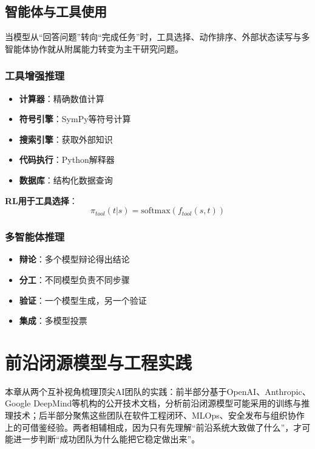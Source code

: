 \documentclass[12pt,a4paper]{article}
\begin{document}
\subsection{智能体与工具使用}

当模型从“回答问题”转向“完成任务”时，工具选择、动作排序、外部状态读写与多智能体协作就从附属能力转变为主干研究问题。

\subsubsection{工具增强推理}

\begin{itemize}
    \item \textbf{计算器}：精确数值计算
    \item \textbf{符号引擎}：SymPy等符号计算
    \item \textbf{搜索引擎}：获取外部知识
    \item \textbf{代码执行}：Python解释器
    \item \textbf{数据库}：结构化数据查询
\end{itemize}

\textbf{RL用于工具选择}：
\begin{equation}
\pi_{tool}(t | s) = \text{softmax}(f_{tool}(s, t))
\end{equation}

\subsubsection{多智能体推理}

\begin{itemize}
    \item \textbf{辩论}：多个模型辩论得出结论
    \item \textbf{分工}：不同模型负责不同步骤
    \item \textbf{验证}：一个模型生成，另一个验证
    \item \textbf{集成}：多模型投票
\end{itemize}

\section{前沿闭源模型与工程实践}

本章从两个互补视角梳理顶尖AI团队的实践：前半部分基于OpenAI、Anthropic、Google DeepMind等机构的公开技术文档，分析前沿闭源模型可能采用的训练与推理技术；后半部分聚焦这些团队在软件工程闭环、MLOps、安全发布与组织协作上的可借鉴经验。两者相辅相成，因为只有先理解“前沿系统大致做了什么”，才可能进一步判断“成功团队为什么能把它稳定做出来”。
\end{document}
